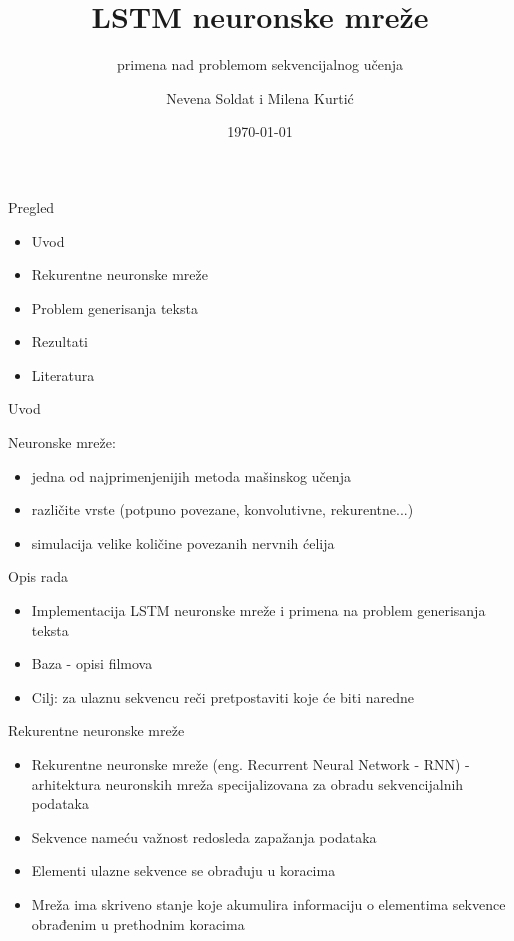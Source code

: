 \documentclass[table]{beamer}
\title[LSTM neuronske mreže]{\textbf{LSTM neuronske mreže}}
\subtitle{primena nad problemom sekvencijalnog učenja}
\author{Nevena Soldat i Milena Kurtić}
\institute{Matematički fakultet, Univerzitet u Beogradu}
\date{\today}
\begin{document}
\frame{\titlepage}


\begin{frame}{Pregled}

\begin{itemize}
    \item Uvod
    \item Rekurentne neuronske mreže
    \item Problem generisanja teksta
    \item Rezultati
    \item Literatura
\end{itemize}

\end{frame}


\begin{frame}{Uvod}

Neuronske mreže:

\begin{itemize}
    \item jedna od najprimenjenijih metoda mašinskog učenja
    \item različite vrste (potpuno povezane, konvolutivne, rekurentne...)
    \item simulacija velike količine povezanih nervnih ćelija
\end{itemize}

\end{frame}

\begin{frame}{Opis rada}
\begin{itemize}
    \item Implementacija LSTM neuronske mreže i primena na problem generisanja teksta
    \item Baza - opisi filmova
    \item Cilj: za ulaznu sekvencu reči pretpostaviti koje će biti naredne
\end{itemize}
    
\end{frame}

\begin{frame}{Rekurentne neuronske mreže}

\begin{itemize}
\item Rekurentne neuronske mreže (eng. Recurrent Neural Network - RNN) - arhitektura neuronskih mreža specijalizovana za obradu sekvencijalnih podataka
\item Sekvence nameću važnost redosleda zapažanja podataka
\item Elementi ulazne sekvence se obrađuju u koracima
\item Mreža ima skriveno stanje koje akumulira informaciju o elementima sekvence obrađenim u prethodnim koracima
\end{itemize}
    
\end{frame}
\end{document}

